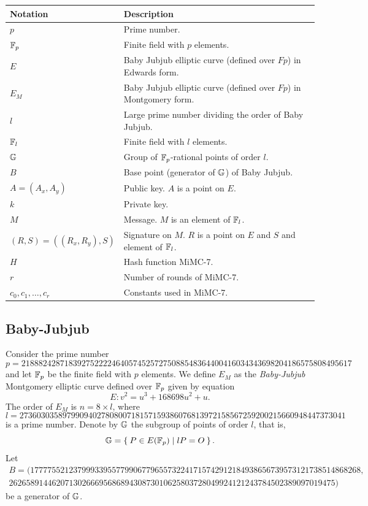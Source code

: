 \documentclass{article}
\begin{document}
\begin{spacing}{1.2}
	\begin{table}[h!]
	\centering
	\begin{tabular}{|l|l|}
		\hline
		{\bf Notation} & {\bf Description}\\
		\hline
		{$p$} & {Prime number.}\\
		{$\mathbb{F}_p$} & {Finite field with $p$ elements.}\\
		{$E$} & {Baby Jubjub elliptic curve (defined over $Fp$) in Edwards form.}\\
		{$E_M$} & {Baby Jubjub elliptic curve (defined over $Fp$) in Montgomery form.}\\
		{$l$} & {Large prime number dividing the order of Baby Jubjub.}\\
		{$\mathbb{F}_l$} & {Finite field with $l$ elements.}\\
		{$\mathbb{G}$} & {Group of $\mathbb{F}_p$-rational points of order $l$.}\\
		{$B$} & {Base point (generator of $\mathbb{G}$) of Baby Jubjub.}\\
		\hline
		{$A = (A_x, A_y)$} & {Public key. $A$ is a point on $E$. }\\
		$k$ & Private key. \\
		$M$ & Message. $M$ is an element of $\mathbb{F}_l$. \\		
		{$(R,S) = ((R_x, R_y), S)$} & Signature on $M$. $R$ is a point on $E$ and $S$ and element of $\mathbb{F}_l$.\\
		\hline		
		{$H$} & {Hash function MiMC-7.}\\
		$r$ & Number of rounds of MiMC-7. \\
		$c_0, c_1, \dots, c_r$ & Constants used in MiMC-7. \\
		\hline
	\end{tabular}
	\label{tab:notation}
	\end{table}

	\subsection{Baby-Jubjub} 	%
	
	Consider the prime number 
		$$	p = 21888242871839275222246405745257275088548364400416034343698204186575808495617 $$
	and let $\mathbb{F}_p$ be the finite field with $p$ elements. We define $E_M$ as the {\it Baby-Jubjub} Montgomery elliptic curve defined over $\mathbb{F}_p$ given by equation
		$$	E: v^2 = u^3 +  168698u^2 + u. $$
	The order of $E_M$ is $n = 8\times l$, where 
		$$	l = 2736030358979909402780800718157159386076813972158567259200215660948447373041 $$ 
	is a prime number. Denote by $\mathbb{G}$ the subgroup of points of order $l$, that is, %
		$$\mathbb{G} = \Set{ P \in E(\ensuremath{\mathbb{F}_p}) | l P = O  }.$$
	Let
		\begin{align*} 
		B =  (17777552123799933955779906779655732241715742912184938656739573121738514868268,\\
		2626589144620713026669568689430873010625803728049924121243784502389097019475)
		\end{align*}
	be a generator of $\mathbb{G}$.\\
	

\end{spacing}
\end{document}
